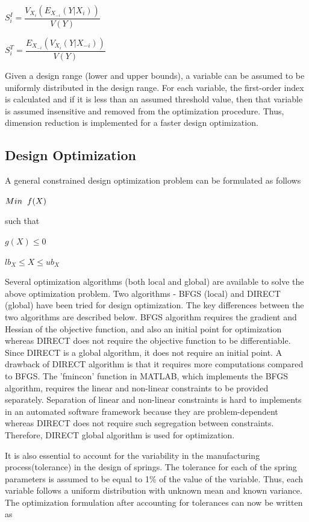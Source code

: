 \documentclass[11pt]{article}
\begin{document}
\centerline{$S_{i}^{I} = \dfrac{V_{X_i}(E_{X_{-i}}(Y|X_{i}))}{V(Y)}$}
\centerline{$S_{i}^{T} = \dfrac{E_{X_{-i}}(V_{X_{i}}(Y|X_{-i}))}{V(Y)}$}

Given a design range (lower and upper bounds), a variable can be assumed to be uniformly distributed in the design range. For each variable, the first-order index is calculated and if it is less than an assumed threshold value, then that variable is assumed insensitive and removed from the optimization procedure. Thus, dimension reduction is implemented for a faster design optimization. \cite{Wahl} \cite{Paredes}\cite{Reliability} \cite{Robust} \cite{Relaxation1} \cite{Relaxation2} \cite{Relaxation3}


\subsection{Design Optimization}
\hspace{5 mm} A general constrained design optimization problem can be formulated as follows

\centerline{$Min \hspace{2 mm} f(X)$}
such that

\centerline{$g(X) \leq 0$}
\centerline{$lb_{X} \leq X \leq ub_{X}$}

\noindent Several optimization algorithms (both local and global) are available to solve the above optimization problem. Two algorithms - BFGS (local) and DIRECT (global) have been tried for design optimization. The key differences between the two algorithms are described below. BFGS algorithm requires the gradient and Hessian of the objective function, and also an initial point for optimization whereas DIRECT does not require the objective function to be differentiable. Since DIRECT is a global algorithm, it does not require an initial point. A drawback of DIRECT algorithm is that it requires more computations compared to BFGS. The 'fmincon' function in MATLAB, which implements the BFGS algorithm, requires the linear and non-linear constraints to be provided separately. Separation of linear and non-linear constraints is hard to implements in an automated software framework because they are problem-dependent whereas DIRECT does not require such segregation between constraints. Therefore, DIRECT global algorithm is used for optimization.

\hspace{5 mm} It is also essential to account for the variability in the manufacturing process(tolerance) in the design of springs. The tolerance for each of the spring parameters is assumed to be equal to 1\% of the value of the variable. Thus, each variable follows a uniform distribution with unknown mean and known variance. The optimization formulation after accounting for tolerances can now be written as 
\end{document}
